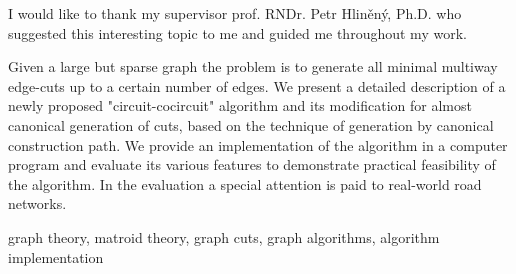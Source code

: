 




  \FrontMatter                    %
    \ThesisTitlePage                %
    \begin{ThesisDeclaration}       %
      \DeclarationText
      \AdvisorName
    \end{ThesisDeclaration}
    \begin{ThesisThanks}            %
      I would like to thank my supervisor prof. RNDr. Petr Hliněný, Ph.D. who suggested this interesting topic to me and guided me throughout my work.


    \end{ThesisThanks}
    \begin{ThesisAbstract}          %

Given a large but sparse graph the problem is to generate all minimal multiway edge-cuts up to a certain number of edges. We present a detailed description of a newly proposed "circuit-cocircuit" algorithm and its modification for almost canonical generation of cuts, based on the technique of generation by canonical construction path. We provide an implementation of the algorithm in a computer program and evaluate its various features to demonstrate practical feasibility of the algorithm. In the evaluation a special attention is paid to real-world road networks.

	\end{ThesisAbstract}
    \begin{ThesisKeyWords}          %
      graph theory, matroid theory, graph cuts, graph algorithms, algorithm implementation
    \end{ThesisKeyWords}
    \tableofcontents                %

\MainMatter                     %










\printbibliography


